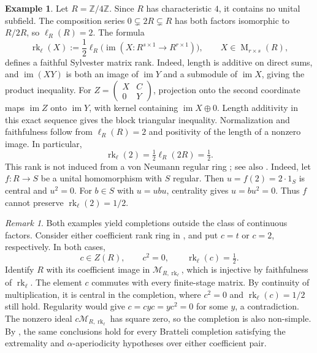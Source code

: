 \documentclass[11pt]{amsart}
\DeclareMathOperator{\rk}{rk}
\DeclareMathOperator{\Mat}{M}
\theoremstyle{definition}
\newtheorem{example}[theorem]{Example}
\theoremstyle{remark}
\newtheorem{remark}[theorem]{Remark}
\begin{document}
\begin{example}
\label{ex:nonregular-rank}
Let $R=\mathbb Z/4\mathbb Z$.
Since $R$ has characteristic $4$, it contains no unital subfield.
The composition series $0\subsetneq 2R\subsetneq R$ has both
factors isomorphic to $R/2R$, so $\ell_R(R)=2$.
The formula
\[
 \rk_\ell(X):=\frac12\ell_R\bigl(\operatorname{im}(X:R^{s\times1}
        \to R^{r\times1})\bigr),
 \qquad X\in\Mat_{r\times s}(R),
\]
defines a faithful Sylvester matrix rank.  Indeed, length is additive on
direct sums, and $\operatorname{im}(XY)$ is both an image of
$\operatorname{im}Y$ and a submodule of $\operatorname{im}X$, giving
the product inequality.  For $Z=\left(\begin{smallmatrix}X&C\\0&Y\end{smallmatrix}\right)$,
projection onto the second coordinate maps $\operatorname{im}Z$ onto
$\operatorname{im}Y$, with kernel containing $\operatorname{im}X\oplus0$.
Length additivity in this exact sequence gives the block triangular
inequality.  Normalization and faithfulness follow from
$\ell_R(R)=2$ and positivity of the length of a nonzero image.
In particular,
\[
 \rk_\ell(2)=\tfrac12\ell_R(2R)=\tfrac12.
\]
This rank is not induced from a von Neumann regular ring
\cite[Example~2.1.13]{LopezAlvarez2021}; see also
\cite[Remark~4.6]{HungLi2023}.
Indeed, let $f:R\to S$ be a unital homomorphism with $S$ regular.  Then
$u=f(2)=2\cdot1_S$ is central and $u^2=0$.
For $b\in S$ with $u=ubu$, centrality gives $u=bu^2=0$.
Thus $f$ cannot preserve $\rk_\ell(2)=1/2$.
\end{example}

\begin{remark}\label{ex:nonregular-completion}
Both examples yield completions outside the class of continuous factors.
Consider either coefficient rank ring in
, and put $c=t$
or $c=2$, respectively.  In both cases,
\[
 c\in Z(R),\qquad c^2=0,\qquad\rk_\ell(c)=\tfrac12.
\]
Identify $R$ with its coefficient image in $\mathcal M_{R,\rk_\ell}$,
which is injective by faithfulness of $\rk_\ell$.
The element $c$ commutes with every finite-stage matrix.  By continuity
of multiplication, it is central in the completion, where
$c^2=0$ and $\rk_\ell(c)=1/2$ still hold.
Regularity would give $c=cyc=yc^2=0$ for some $y$, a contradiction.
The nonzero ideal $c\mathcal M_{R,\rk_\ell}$ has square zero, so the completion
is also non-simple.  By , the same conclusions hold for
every Bratteli completion satisfying the extremality and
$\alpha$-aperiodicity hypotheses over either coefficient pair.
\end{remark}
\end{document}
